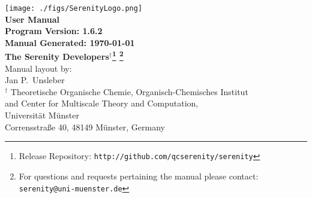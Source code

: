 \documentclass[bibliography=totocnumbered,a4paper,10pt,oneside]{scrbook}
\begin{document}
\thispagestyle{empty}
\begin{center}
\vspace*{1cm}
\texttt{[image: ./figs/SerenityLogo.png]}\\
\vspace{2cm}
{\LARGE\textbf{
User Manual
}}\\
\vspace{1cm}
{\large\textbf{
Program Version: 1.6.2\\
Manual Generated: \today
}}\\
\vspace{2cm}
{\large\textbf{
The Serenity Developers$^{\dagger}$\footnote{Release Repository: \texttt{http://github.com/qcserenity/serenity}}
\footnote{For questions and requests pertaining the manual please contact:\\ \texttt{serenity@uni-muenster.de}}
}}\\
\vspace{2cm}
{\large Manual layout by: \\
Jan P.\ Unsleber
}
\\[2ex]

$^{\dagger}$ Theoretische Organische Chemie,
Organisch-Chemisches Institut \\
and Center for Multiscale Theory and Computation,\\
Universit\"at M\"unster\\
Corrensstra{\ss}e 40, 48149 M\"unster, Germany\\[2ex]

\vfill
\end{center}
\newpage
{}
\setcounter{page}{1}
\tableofcontents

\newpage
{}
\setcounter{page}{1}










\clearpage

\end{document}
